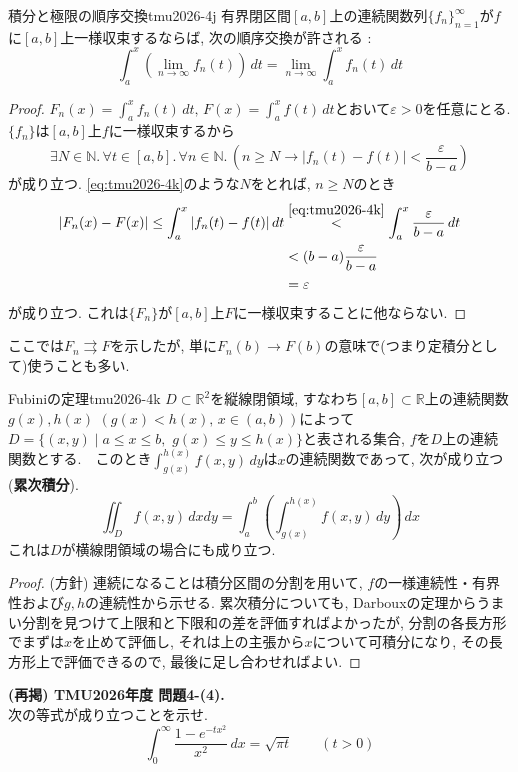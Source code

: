 \documentclass[titlepage]{jsarticle}
\numberwithin{equation}{section}
\newcommand{\N}{\mathbb{N}}%
\newcommand{\R}{\mathbb{R}}%
\begin{document}
\begin{thm}{積分と極限の順序交換}{tmu2026-4j}
有界閉区間$[a, b]$上の連続関数列$\{f_n\}_{n=1}^\infty$が$f$に$[a, b]$上一様収束するならば, 次の順序交換が許される : 
\[
\int_a^x\left(\lim_{n \to \infty} f_n(t)\right)\,dt = \lim_{n \to \infty} \int_a^x f_n(t)\,dt
\]
\end{thm}
\begin{proof}
$\displaystyle{F_n(x) = \int_a^x f_n(t)\,dt},\,\displaystyle{F(x) = \int_a^x f(t)\,dt}$とおいて$\varepsilon > 0$を任意にとる. $\{f_n\}$は$[a, b]$上$f$に一様収束するから
\begin{align}
\exists N \in \N.\,\forall t \in [a, b].\,\forall n \in \N.\,\left(n \ge N \to |f_n(t) - f(t)| < \dfrac{\varepsilon}{b-a}\right) \label{eq:tmu2026-4k}
\end{align}
が成り立つ. \eqref{eq:tmu2026-4k}のような$N$をとれば, $n \ge N$のとき
\begin{align*}
|F_n(x) - F(x)| \le \int_a^x |f_n(t) - f(t)|\,dt &\stackrel{\eqref{eq:tmu2026-4k}}{<} \int_a^x \dfrac{\varepsilon}{b-a}\,dt\\
&<  (b - a)\dfrac{\varepsilon}{b-a} \\
&= \varepsilon
\end{align*}
が成り立つ. これは$\{F_n\}$が$[a, b]$上$F$に一様収束することに他ならない.
\end{proof}
ここでは$F_n \rightrightarrows F$を示したが, 単に$F_n(b) \to F(b)$の意味で(つまり定積分として)使うことも多い.
\begin{thm}{Fubiniの定理}{tmu2026-4k}
$D \subset \R^2$を縦線閉領域, すなわち$[a, b] \subset \R$上の連続関数$g(x), h(x)\,\,(g(x) < h(x),\,x \in (a,b))$によって$D = \{(x, y) \mid a \le x \le b,\,\,g(x) \le y \le h(x)\}$と表される集合, $f$を$D$上の連続関数とする.　このとき$\displaystyle{\int_{g(x)}^{h(x)} f(x, y)\,dy}$は$x$の連続関数であって, 次が成り立つ (\textbf{累次積分}).
\[
\iint_Df(x, y)\,dxdy = \int_a^b\left(\int_{g(x)}^{h(x)} f(x, y)\,dy\right)\,dx
\]
これは$D$が横線閉領域の場合にも成り立つ.
\end{thm}
\begin{proof}
(方針) 連続になることは積分区間の分割を用いて, $f$の一様連続性・有界性および$g, h$の連続性から示せる. 累次積分についても, Darbouxの定理からうまい分割を見つけて上限和と下限和の差を評価すればよかったが, 分割の各長方形でまずは$x$を止めて評価し, それは上の主張から$x$について可積分になり, その長方形上で評価できるので, 最後に足し合わせればよい.
\end{proof}
\begin{problem}
\textbf{(再掲) TMU2026年度 問題4-(4).}\\
次の等式が成り立つことを示せ.
\[
\int_0^\infty \dfrac{1 - e^{-tx^2}}{x^2}\,dx = \sqrt{\pi t}\qquad(t > 0)
\]
\end{problem}
\end{document}
